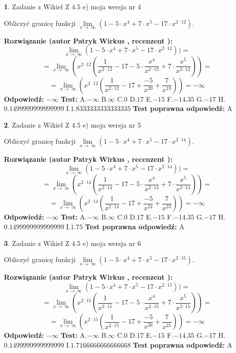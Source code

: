 \documentclass[12pt, a4paper]{article}
\theoremstyle{definition} %
\newtheorem{zad}{}
\newcommand{\zadStart}[1]{\begin{zad}#1\newline}
\newcommand{\zadStop}{\end{zad}}
\newcommand{\rozwStart}[2]{\noindent \textbf{Rozwiązanie (autor #1 , recenzent #2): }\newline}
\newcommand{\rozwStop}{\newline}
\newcommand{\odpStart}{\noindent \textbf{Odpowiedź:}\newline}
\newcommand{\odpStop}{\newline}
\newcommand{\testStart}{\noindent \textbf{Test:}\newline}
\newcommand{\testStop}{\newline}
\newcommand{\kluczStart}{\noindent \textbf{Test poprawna odpowiedź:}\newline}
\newcommand{\kluczStop}{\newline}
\begin{document}
\zadStart{Zadanie z Wikieł Z 4.5 e) moja wersja nr 4}


Obliczyć granicę funkcji  $\lim\limits_{x\to\ \infty}(1 - 5 \cdot x^{4}+7 \cdot x^{5}- 17 \cdot x^{2\cdot12})$.
\zadStop
\rozwStart{Patryk Wirkus}{}
$$\lim\limits_{x\to\ \infty}(1 - 5 \cdot x^{4}+7 \cdot x^{5}- 17 \cdot x^{2\cdot12}))=$$
$$=\lim\limits_{x\to\ \infty}(x^{2\cdot12}(\frac{1}{x^{2\cdot12}}-17 -5 \cdot \frac{x^{4}}{x^{2\cdot12}}+7 \cdot \frac{x^{5}}{x^{2\cdot12}}))=$$
$$=\lim\limits_{x\to\ \infty}(x^{2\cdot12}(\frac{1}{x^{2\cdot12}}-17 + \frac{-5}{x^{20}}+ \frac{7}{x^{19}}))=-\infty$$
\rozwStop
\odpStart
$-\infty$
\odpStop
\testStart
A.$-\infty$ B.$\infty$ C.$0$ D.$17$ E.$-15$
F.$-14.35$ G.$-17$
H.$0.1499999999999999$
I.$1.8333333333333335$
\testStop
\kluczStart
A
\kluczStop



\zadStart{Zadanie z Wikieł Z 4.5 e) moja wersja nr 5}


Obliczyć granicę funkcji  $\lim\limits_{x\to\ \infty}(1 - 5 \cdot x^{4}+7 \cdot x^{5}- 17 \cdot x^{2\cdot14})$.
\zadStop
\rozwStart{Patryk Wirkus}{}
$$\lim\limits_{x\to\ \infty}(1 - 5 \cdot x^{4}+7 \cdot x^{5}- 17 \cdot x^{2\cdot14}))=$$
$$=\lim\limits_{x\to\ \infty}(x^{2\cdot14}(\frac{1}{x^{2\cdot14}}-17 -5 \cdot \frac{x^{4}}{x^{2\cdot14}}+7 \cdot \frac{x^{5}}{x^{2\cdot14}}))=$$
$$=\lim\limits_{x\to\ \infty}(x^{2\cdot14}(\frac{1}{x^{2\cdot14}}-17 + \frac{-5}{x^{24}}+ \frac{7}{x^{23}}))=-\infty$$
\rozwStop
\odpStart
$-\infty$
\odpStop
\testStart
A.$-\infty$ B.$\infty$ C.$0$ D.$17$ E.$-15$
F.$-14.35$ G.$-17$
H.$0.1499999999999999$
I.$1.75$
\testStop
\kluczStart
A
\kluczStop



\zadStart{Zadanie z Wikieł Z 4.5 e) moja wersja nr 6}


Obliczyć granicę funkcji  $\lim\limits_{x\to\ \infty}(1 - 5 \cdot x^{4}+7 \cdot x^{5}- 17 \cdot x^{2\cdot15})$.
\zadStop
\rozwStart{Patryk Wirkus}{}
$$\lim\limits_{x\to\ \infty}(1 - 5 \cdot x^{4}+7 \cdot x^{5}- 17 \cdot x^{2\cdot15}))=$$
$$=\lim\limits_{x\to\ \infty}(x^{2\cdot15}(\frac{1}{x^{2\cdot15}}-17 -5 \cdot \frac{x^{4}}{x^{2\cdot15}}+7 \cdot \frac{x^{5}}{x^{2\cdot15}}))=$$
$$=\lim\limits_{x\to\ \infty}(x^{2\cdot15}(\frac{1}{x^{2\cdot15}}-17 + \frac{-5}{x^{26}}+ \frac{7}{x^{25}}))=-\infty$$
\rozwStop
\odpStart
$-\infty$
\odpStop
\testStart
A.$-\infty$ B.$\infty$ C.$0$ D.$17$ E.$-15$
F.$-14.35$ G.$-17$
H.$0.1499999999999999$
I.$1.7166666666666668$
\testStop
\kluczStart
A
\kluczStop
\end{document}
